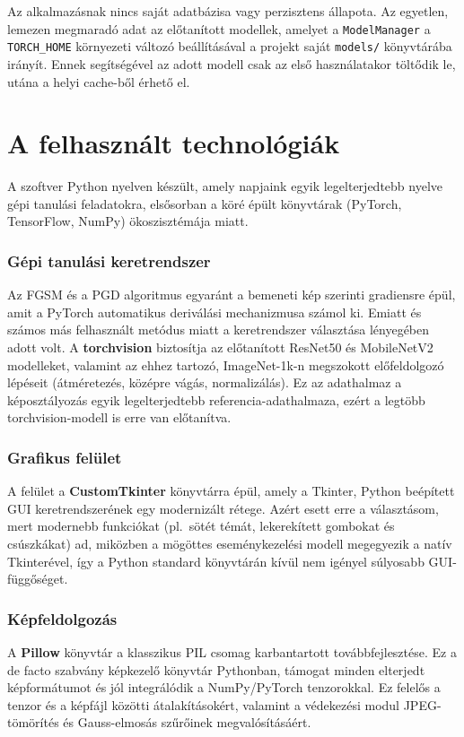 Az alkalmazásnak nincs saját adatbázisa vagy perzisztens állapota. 
Az egyetlen, lemezen megmaradó adat az előtanított modellek, amelyet a \texttt{ModelManager} a \texttt{TORCH\_HOME} környezeti 
változó beállításával a projekt saját \texttt{models/} könyvtárába irányít. 
Ennek segítségével az adott modell csak az első használatakor töltődik le, utána a helyi cache-ből érhető el. 

\section{A felhasznált technológiák}
A szoftver Python nyelven készült, amely napjaink egyik legelterjedtebb nyelve gépi tanulási feladatokra, elsősorban a köré 
épült könyvtárak (PyTorch, TensorFlow, NumPy) ökoszisztémája miatt. 

\subsubsection{Gépi tanulási keretrendszer}
Az FGSM és a PGD algoritmus egyaránt a bemeneti kép szerinti gradiensre épül, amit a PyTorch automatikus deriválási mechanizmusa számol ki. 
Emiatt és számos más felhasznált metódus miatt a keretrendszer választása lényegében adott volt. 
A \textbf{torchvision} biztosítja az előtanított ResNet50 és MobileNetV2 modelleket, valamint az ehhez tartozó, ImageNet-1k-n 
megszokott előfeldolgozó lépéseit (átméretezés, középre vágás, normalizálás). 
Ez az adathalmaz a képosztályozás egyik legelterjedtebb referencia-adathalmaza, ezért a legtöbb torchvision-modell is erre van 
előtanítva. 

\subsubsection{Grafikus felület}
A felület a \textbf{CustomTkinter} könyvtárra épül, amely a Tkinter, Python beépített GUI keretrendszerének egy modernizált 
rétege. 
Azért esett erre a választásom, mert modernebb funkciókat (pl.\ sötét témát, lekerekített gombokat és csúszkákat) ad, miközben a 
mögöttes eseménykezelési modell megegyezik a natív Tkinterével, így a Python standard könyvtárán kívül nem igényel súlyosabb 
GUI-függőséget. 

\subsubsection{Képfeldolgozás}
A \textbf{Pillow} könyvtár a klasszikus PIL csomag karbantartott továbbfejlesztése. 
Ez a de facto szabvány képkezelő könyvtár Pythonban, támogat minden elterjedt képformátumot és jól integrálódik a 
NumPy/PyTorch tenzorokkal. 
Ez felelős a tenzor és a képfájl közötti átalakításokért, valamint a védekezési modul JPEG-tömörítés és Gauss-elmosás szűrőinek 
megvalósításáért. 

